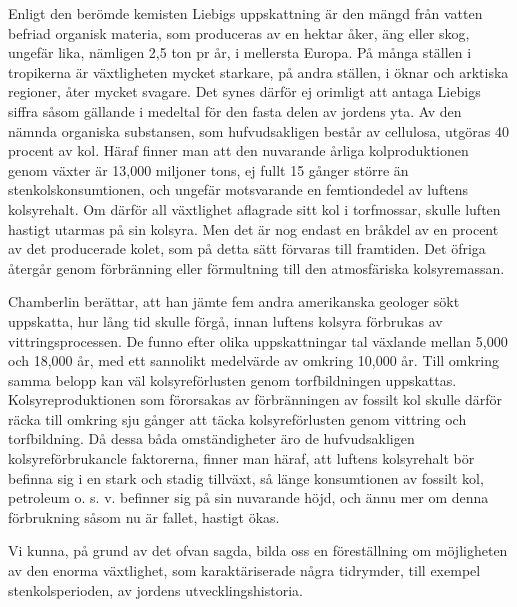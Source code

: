 \documentclass[a4paper, 12pt, oneside, swedish]{article}
\begin{document}
Enligt den berömde kemisten Liebigs uppskattning är den mängd från vatten befriad organisk materia, som produceras av en hektar åker, äng eller skog, ungefär lika, nämligen 2,5 ton pr år, i mellersta Europa. På många ställen i tropikerna är växtligheten mycket starkare, på andra ställen, i öknar och arktiska regioner, åter mycket svagare. Det synes därför ej orimligt att antaga Liebigs siffra såsom gällande i medeltal för den fasta delen av jordens yta. Av den nämnda organiska substansen, som hufvudsakligen består av cellulosa, utgöras 40 procent av kol. Häraf finner man att den nuvarande årliga kolproduktionen genom växter är 13,000 miljoner tons, ej fullt 15 gånger större än stenkolskonsumtionen, och ungefär motsvarande en femtiondedel av luftens kolsyrehalt. Om därför all växtlighet aflagrade sitt kol i torfmossar, skulle luften hastigt utarmas på sin kolsyra. Men det är nog endast en bråkdel av en procent av det producerade kolet, som på detta sätt förvaras till framtiden. Det öfriga återgår genom förbränning eller förmultning till den atmosfäriska kolsyremassan.

Chamberlin berättar, att han jämte fem andra amerikanska geologer sökt uppskatta, hur lång tid skulle förgå, innan luftens kolsyra förbrukas av vittringsprocessen. De funno efter olika uppskattningar tal växlande mellan 5,000 och 18,000 år, med ett sannolikt medelvärde av omkring 10,000 år. Till omkring samma belopp kan väl kolsyreförlusten genom torfbildningen uppskattas. Kolsyreproduktionen som förorsakas av förbränningen av fossilt kol skulle därför räcka till omkring sju gånger att täcka kolsyreförlusten genom vittring och torfbildning. Då dessa båda omständigheter äro de hufvudsakligen kolsyreförbrukancle faktorerna, finner man häraf, att luftens kolsyrehalt bör befinna sig i en stark och stadig tillväxt, så länge konsumtionen av fossilt kol, petroleum o. s. v. befinner sig på sin nuvarande höjd, och ännu mer om denna förbrukning såsom nu är fallet, hastigt ökas.

Vi kunna, på grund av det ofvan sagda, bilda oss en föreställning om möjligheten av den enorma växtlighet, som karaktäriserade några tidrymder, till exempel stenkolsperioden, av jordens utvecklingshistoria.
\end{document}
